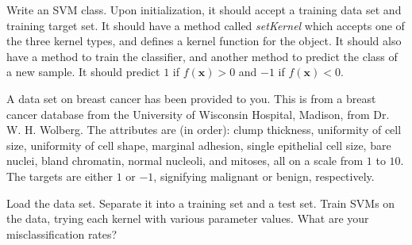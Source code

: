\begin{problem}
Write an SVM class. Upon initialization, it should accept a training data set and training target set. It should have a method called \emph{setKernel} which accepts one of the three kernel types, and defines a kernel function for the object. It should also have a method to train the classifier, and another method to predict the class of a new sample. It should predict $1$ if $f(\mathbf{x}) > 0$ and $-1$ if $f(\mathbf{x}) < 0$.
\end{problem}

A data set on breast cancer has been provided to you. This is from a breast cancer database from the University of Wisconsin Hospital, Madison, from Dr. W. H. Wolberg. The attributes are (in order): clump thickness, uniformity of cell size, uniformity of cell shape, marginal adhesion, single epithelial cell size, bare nuclei, bland chromatin, normal nucleoli, and mitoses, all on a scale from $1$ to $10$. The targets are either $1$ or $-1$, signifying malignant or benign, respectively.

\begin{problem}
Load the data set. Separate it into a training set and a test set. Train SVMs on the data, trying each kernel with various parameter values. What are your misclassification rates?
\end{problem}
